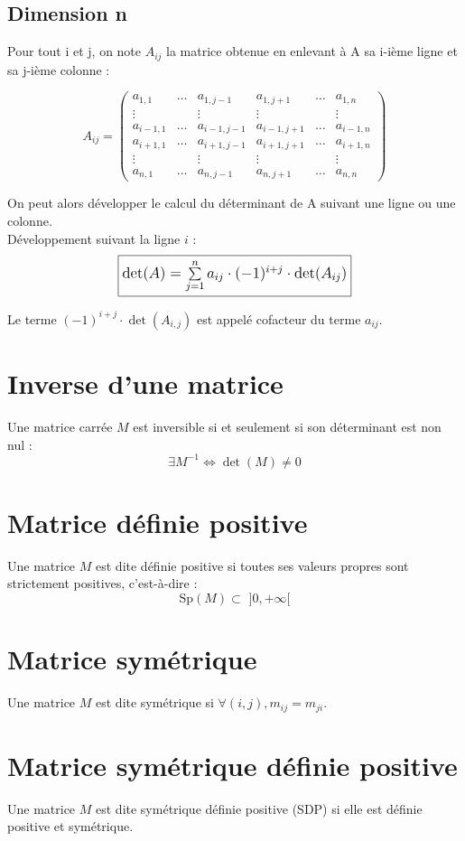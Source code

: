 \subsection{Dimension n}

Pour tout i et j, on note $A_{ij}$ la matrice obtenue en enlevant à A sa i-ième ligne et sa j-ième colonne :

\begin{equation*}
A_{ij}=\begin{pmatrix}a_{1,1} & \dots & a_{1,j-1}& a_{1,j+1}& \dots & a_{1,n} \\\vdots & & \vdots &  \vdots& &\vdots\\
a_{i-1,1} & \dots & a_{i-1,j-1}& a_{i-1,j+1}& \dots & a_{i-1,n} \\
a_{i+1,1} & \dots & a_{i+1,j-1}& a_{i+1,j+1}& \dots & a_{i+1,n} \\
\vdots & & \vdots & \vdots &&\vdots\\
a_{n,1} & \dots & a_{n,j-1}& a_{n,j+1}& \dots & a_{n,n}\end{pmatrix} 
\end{equation*}


On peut alors développer le calcul du déterminant de A suivant une ligne ou une colonne.
\\

Développement suivant la ligne $i$ :
\begin{equation*}
\large{\fbox{$\det(A)=\sum \limits_{j=1}^{n} a_{ij} \cdot (-1)^{i+j} \cdot \det(A_{ij})$}}
\end{equation*}

Le terme $(-1)^{i+j} \cdot \det(A_{i,j})$ est appelé cofacteur du terme $a_{ij}$.



\section{Inverse d'une matrice}

Une matrice carrée $M$ est inversible si et seulement si son déterminant est non nul :
\begin{equation*}
\exists M^{-1} \iff \det(M) \ne 0
\end{equation*}



\section{Matrice définie positive}

Une matrice $M$ est dite définie positive si toutes ses valeurs propres sont strictement positives, c'est-à-dire :
\begin{equation*}
\mathrm{Sp}(M) \subset\,\, ]0, +\infty[
\end{equation*}


\section{Matrice symétrique}

Une matrice $M$ est dite symétrique si $\forall (i, j), m_{ij} = m_{ji}$.


\section{Matrice symétrique définie positive}

Une matrice $M$ est dite symétrique définie positive (SDP) si elle est définie positive et symétrique.


